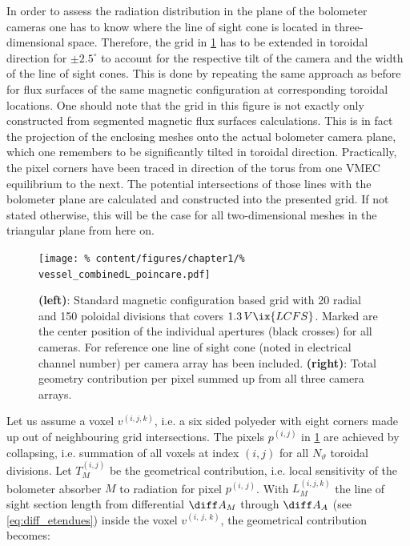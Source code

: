 %
                In order to assess the radiation distribution in the plane of the bolometer cameras one has to know where the line of sight cone is located in three-dimensional space. Therefore, the grid in \cref{fig:los_grid_emiss} has to be extended in toroidal direction for $\pm 2.5^{\circ}$ to account for the respective tilt of the camera and the width of the line of sight cones. This is done by repeating the same approach as before for flux surfaces of the same magnetic configuration at corresponding toroidal locations. One should note that the grid in this figure is not exactly only constructed from segmented magnetic flux surfaces calculations. This is in fact the projection of the enclosing meshes onto the actual bolometer camera plane, which one remembers to be significantly tilted in toroidal direction. Practically, the pixel corners have been traced in direction of the torus from one VMEC equilibrium to the next. The potential intersections of those lines with the bolometer plane are calculated and constructed into the presented grid. If not stated otherwise, this will be the case for all two-dimensional meshes in the triangular plane from here on.\\%
%
                \begin{figure}[t]%
                    \centering%
                    \texttt{[image: \%
                        content/figures/chapter1/\%
                        vessel\_combinedL\_poincare.pdf]}%
                    \caption{\textbf{(left)}: Standard magnetic configuration based grid with 20 radial and 150 poloidal divisions that covers $1.3\,V\ix{LCFS}$. Marked are the center position of the individual apertures (black crosses) for all cameras. For reference one line of sight cone (noted in electrical channel number) per camera array has been included. \textbf{(right)}: Total geometry contribution per pixel summed up from all three camera arrays.}\label{fig:los_grid_emiss}%
                \end{figure}%
%
                Let us assume a voxel $v^{\left(i,j,k\right)}$, i.e. a six sided polyeder with eight corners made up out of neighbouring grid intersections. The pixels $p^{\left(i,j\right)}$ in \cref{fig:los_grid_emiss} are achieved by collapsing, i.e. summation of all voxels at index $\left(i,j\right)$ for all $N_{\vartheta}$ toroidal divisions. Let $T^{\left(i,j\right)}_{M}$ be the geometrical contribution, i.e. local sensitivity of the bolometer absorber $M$ to radiation for pixel $p^{\left(i,\,j\right)}$. With $L^{\left(i,j,k\right)}_{M}$ the line of sight section length from differential $\diff A_{M}$ through $\diff A_{A}$ (see \cref{eq:diff_etendues}) inside the voxel $v^{\left(i,\,j,\,k\right)}$, the geometrical contribution becomes:%

